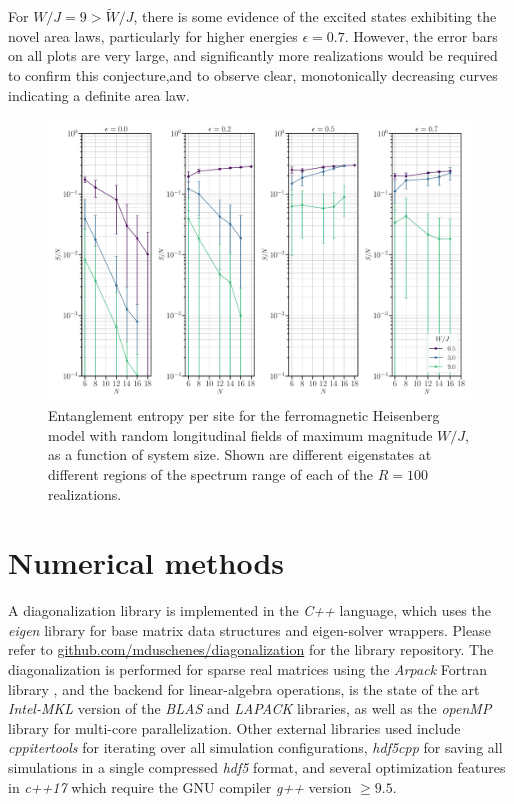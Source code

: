 \documentclass[12pt]{article}{}
\begin{document}
For $W/J = 9 > \tilde{W}/J$, there is some evidence of the excited states exhibiting the novel area laws, particularly for higher energies $\epsilon = 0.7$. However, the error bars on all plots are very large, and significantly more realizations would be required to confirm this conjecture,and to observe clear, monotonically decreasing curves indicating a definite area law.
\begin{figure}[H]
  \centering
  \includegraphics[width=1\textwidth]{figures/heisenberg/entanglement__N__U__J__h__sigma.pdf}
  \caption{Entanglement entropy per site for the ferromagnetic Heisenberg model with random longitudinal fields of maximum magnitude $W/J$, as a function of system size. Shown are different eigenstates at different regions of the spectrum range of each of the $R = 100$ realizations.}
  \label{fig:heisenberg_entanglement_N}
\end{figure}


\newpage
\section*{Numerical methods} \label{sec:numericalmethods}

A diagonalization library is implemented in the \emph{C++} language, which uses the \emph{eigen} \cite{eigen} library for base matrix data structures and eigen-solver wrappers. Please refer to \href{https://github.com/mduschenes/diagonalization}{github.com/mduschenes/diagonalization} for the library repository. The diagonalization is performed for sparse real matrices using the \emph{Arpack} Fortran library \cite{Lehoucq1998}, and the backend for linear-algebra operations, is the state of the art \emph{Intel-MKL} version of the \emph{BLAS} and \emph{LAPACK} libraries, as well as the \emph{openMP} library for multi-core parallelization. Other external libraries used include \emph{cppitertools} for iterating over all simulation configurations, \emph{hdf5cpp} for saving all simulations in a single compressed \emph{hdf5} format, and several optimization features in \emph{c++17} which require the GNU compiler \emph{g++} version $\geq 9.5$.
\end{document}
